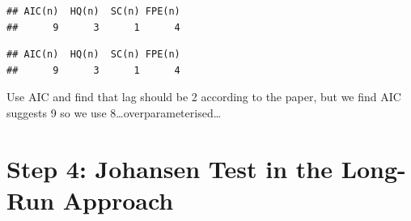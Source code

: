 \documentclass[11pt,preprint, authoryear]{elsarticle}
\numberwithin{equation}{section}
\numberwithin{figure}{section}
\numberwithin{table}{section}
\begin{document}
\begin{verbatim}
## AIC(n)  HQ(n)  SC(n) FPE(n) 
##      9      3      1      4
\end{verbatim}

\begin{verbatim}
## AIC(n)  HQ(n)  SC(n) FPE(n) 
##      9      3      1      4
\end{verbatim}

Use AIC and find that lag should be 2 according to the paper, but we
find AIC suggests 9 so we use 8\ldots overparameterised\ldots{}

\hypertarget{step-4-johansen-test-in-the-long-run-approach}{%
\section{Step 4: Johansen Test in the Long-Run
Approach}\label{step-4-johansen-test-in-the-long-run-approach}}
\end{document}
